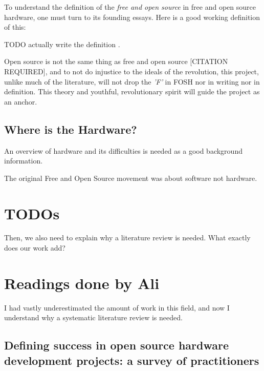 \documentclass{article}
\begin{document}
To understand the definition of the \textit{free and open source} in free and open source hardware, one must turn to its founding essays. Here is a good working definition of this:

TODO actually write the definition \cite{b0_stallman}.

Open source is not the same thing as free and open source [CITATION REQUIRED], and to not do injustice to the ideals of the revolution, this project, unlike much of the literature, will not drop the \textit{'F'} in FOSH nor in writing nor in definition.
This theory and youthful, revolutionary spirit will guide the project as an anchor.

\subsection{Where is the Hardware?}
An overview of hardware and its difficulties is needed as a good background information. 

The original Free and Open Source movement was about software not hardware.


\section{TODOs}



Then, we also need to explain why a literature review is needed.
What exactly does our work add?

\section{Readings done by Ali}

I had vastly underestimated the amount of work in this field, and now I understand why a systematic literature review is needed.

\subsection{Defining success in open source hardware development projects: a survey of practitioners}
\cite{p1_def_succ}
\end{document}
